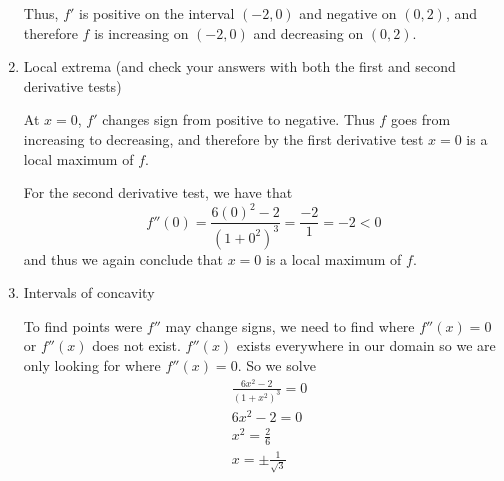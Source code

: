 \documentclass[nooutcomes,handout]{ximera}
\begin{document}
\begin{problem}
\begin{enumerate}
\begin{freeResponse}
		
\begin{center}
\begin{image}
\end{image}
\end{center}


		Thus, $f'$ is positive on the interval $(-2,0)$ and negative on $(0,2)$, and therefore $f$ is increasing on $(-2,0)$ and decreasing on $(0,2)$.  
		\end{freeResponse}
	\item  Local extrema (and check your answers with both the first and second derivative tests)
	
		\begin{freeResponse}
		At $x=0$, $f'$ changes sign from positive to negative.  Thus $f$ goes from increasing to decreasing, and therefore by the first derivative test $x=0$ is a local maximum of $f$.  
		
		For the second derivative test, we have that
		$$ f''(0) = \frac{6(0)^2 - 2}{(1+0^2)^3} = \frac{-2}{1} = -2 < 0 $$
		and thus we again conclude that $x=0$ is a local maximum of $f$.
		\end{freeResponse}
	\item  Intervals of concavity
	
		\begin{freeResponse}
		To find points were $f''$ may change signs, we need to find where $f''(x)=0$ or $f''(x)$ does not exist.  $f''(x)$ exists everywhere in our domain so we are only looking for where $f''(x)=0$.  So we solve
		\begin{align*}
  		& \frac{6{{x}^{2}}-2}{{{(1+{{x}^{2}})}^{3}}}=0 \\ 
 		& 6{{x}^{2}}-2=0 \\ 
 		& {{x}^{2}}=\frac{2}{6} \\ 
 		& x=\pm \frac{1}{\sqrt{3}} \\ 
		\end{align*}
		

\end{freeResponse}
\end{enumerate}
\end{problem}
\end{document}
